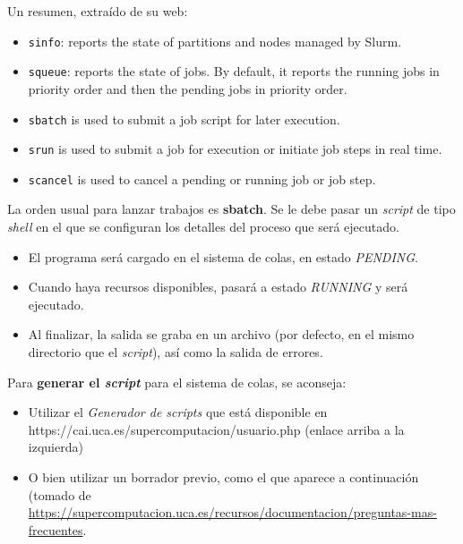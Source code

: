 Un resumen, extraído de su web:
\begin{itemize}
\item \texttt{sinfo}: reports the state of partitions and nodes
  managed by Slurm.
\item \texttt{squeue}: reports the state of jobs. By default, it
  reports the running jobs in priority order and then the pending jobs
  in priority order.
\item \texttt{sbatch} is used to submit a job script for later
  execution.
\item \texttt{srun} is used to submit a job for execution or
  initiate job steps in real time.
\item \texttt{scancel} is used to cancel a pending or running job or
  job step.
\end{itemize}

La orden usual para lanzar trabajos es \textbf{sbatch}. Se le debe
pasar un \textit{script} de tipo \textit{shell} en el que se
configuran los detalles del proceso que será ejecutado.
\begin{itemize}
\item El programa
será cargado en el sistema de colas, en estado \textit{PENDING}.
\item Cuando haya recursos disponibles, pasará a estado
  \textit{RUNNING} y será ejecutado.
\item Al finalizar, la salida se graba en un archivo (por defecto, en
  el mismo directorio que el \textit{script}), así como la salida de
  errores.
\end{itemize}
Para \textbf{generar el \textit{script}} para el sistema de colas, se aconseja:
\begin{itemize}
\item Utilizar el \textit{Generador de scripts} que está disponible en
https://cai.uca.es/supercomputacion/usuario.php (enlace arriba a la izquierda)
\item O bien utilizar un borrador previo, como el que aparece a continuación (tomado de \url{https://supercomputacion.uca.es/recursos/documentacion/preguntas-mas-frecuentes}.
\end{itemize}

